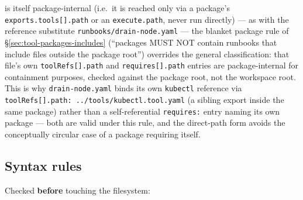 \begin{itemize}
{        is itself package-internal} (i.e.\ it is reached only via a
        package's \texttt{exports.tools[].path} or an \texttt{execute.path},
        never run directly) --- as with the reference substitute
        \texttt{runbooks/drain-node.yaml} --- the blanket package rule of
        \S\ref{sec:tool-packages-includes} (``packages MUST NOT contain
        runbooks that include files outside the package root'') overrides
        the general classification: that file's own
        \texttt{toolRefs[].path} and \texttt{requires[].path} entries are
        package-internal for containment purposes, checked against the
        package root, not the workspace root. This is why
        \texttt{drain-node.yaml} binds its own \texttt{kubectl} reference
        via \texttt{toolRefs[].path: ../tools/kubectl.tool.yaml} (a sibling
        export inside the same package) rather than a self-referential
        \texttt{requires:} entry naming its own package --- both are valid
        under this rule, and the direct-path form avoids the conceptually
        circular case of a package requiring itself.
\end{itemize}

\subsection{Syntax rules}

Checked \textbf{before} touching the filesystem:

